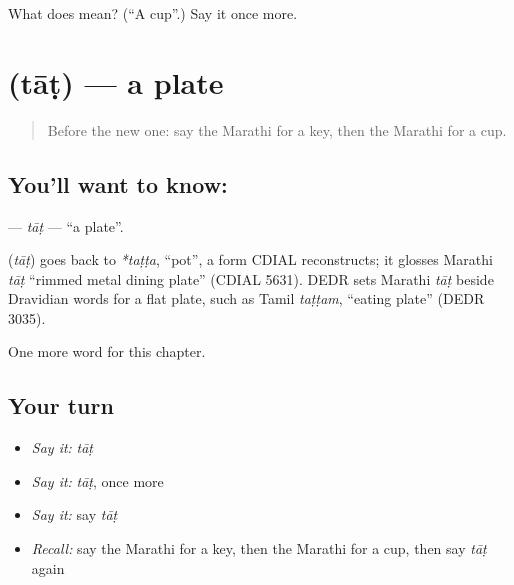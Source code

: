 \begin{tcolorbox}[breakable,colback=teal!4,colframe=teal!35!black,title={Before you move on}]
What does  mean? (\textquotedblleft{}A cup\textquotedblright{}.) Say it once more.
\end{tcolorbox}
\section[\texorpdfstring{\mr{ताट} (tāṭ)}{ताट (tāṭ)}]{ (tāṭ) — a plate}

\label{lesson:MR-C92-tat}



\begin{quote}
Before the new one: say the Marathi for a key, then the Marathi for a cup.
\end{quote}

\subsection*{You'll want to know: }
\textbf{} — \emph{tāṭ} — \textquotedblleft{}a plate\textquotedblright{}.

\begin{cousinweb}
\textbf{} (\emph{tāṭ}) goes back to \emph{*taṭṭa}, \textquotedblleft{}pot\textquotedblright{}, a form CDIAL reconstructs; it glosses Marathi \emph{tāṭ} \textquotedblleft{}rimmed metal dining plate\textquotedblright{} (CDIAL 5631). DEDR sets Marathi \emph{tāṭ} beside Dravidian words for a flat plate, such as Tamil \emph{taṭṭam}, \textquotedblleft{}eating plate\textquotedblright{} (DEDR 3035).
\end{cousinweb}

\begin{grammarlens}[title={What you've built}]
One more word for this chapter.
\end{grammarlens}

\subsection*{Your turn}
\begin{itemize}
\raggedright
  \item \emph{Say it:} \emph{tāṭ}
  \item \emph{Say it:} \emph{tāṭ}, once more
  \item \emph{Say it:} say \emph{tāṭ}
  \item \emph{Recall:} say the Marathi for a key, then the Marathi for a cup, then say \emph{tāṭ} again
\end{itemize}

